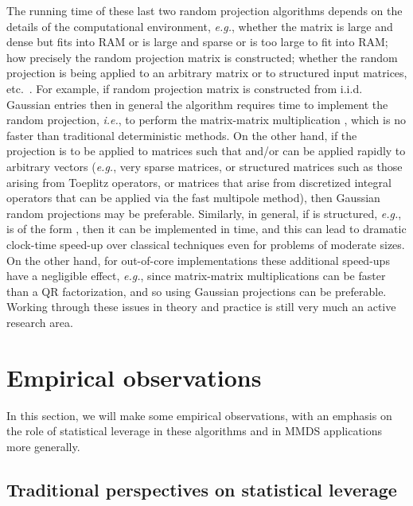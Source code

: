\documentclass[twoside]{article}
\begin{document}
The running time of these last two random projection algorithms depends on 
the details of the computational environment, \emph{e.g.}, whether the 
matrix is large and dense but fits into RAM or is large and sparse or is too 
large to fit into RAM; how precisely the random projection matrix is 
constructed; whether the random projection is being applied to an arbitrary 
matrix  or to structured input matrices, etc.~\cite{HMT09_SIREV}.
For example, if random projection matrix  is constructed from i.i.d.
Gaussian entries then in general the algorithm requires  time to 
implement the random projection, \emph{i.e.}, to perform the matrix-matrix 
multiplication , which is no faster than traditional deterministic 
methods.
On the other hand, if the projection is to be applied to matrices 
such that  and/or  can be applied rapidly to arbitrary vectors
(\emph{e.g.}, very sparse matrices, or structured matrices such as those 
arising from Toeplitz operators, or matrices that arise from discretized 
integral operators that can be applied via the fast multipole method), 
then Gaussian random projections may be preferable.
Similarly, in general, if  is structured, \emph{e.g.}, is of the 
form , then it can be implemented in  time, and
this can lead to dramatic clock-time speed-up over classical techniques even 
for problems of moderate sizes.
On the other hand, for out-of-core implementations these additional speed-ups 
have a negligible effect, \emph{e.g.}, since matrix-matrix multiplications 
can be faster than a QR factorization, and so using Gaussian projections can 
be preferable.
Working through these issues in theory and practice is still very much an 
active research area.



 \section{Empirical observations}
\label{sxn:empirical}

In this section, we will make some empirical observations, with an emphasis
on the role of statistical leverage in these algorithms and in MMDS 
applications more generally.

\subsection{Traditional perspectives on statistical leverage} 
\label{sxn:empirical-traditional}
\end{document}
